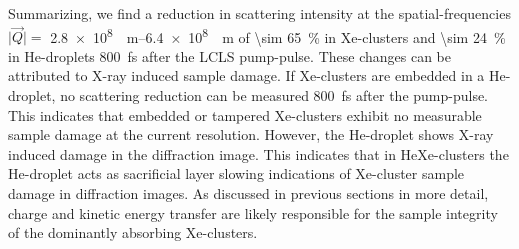 %
Summarizing, we find a reduction in scattering intensity at the spatial-frequencies $\lvert \vec{Q}\rvert=$ \SIrange[scientific-notation = fixed, fixed-exponent = 8]{2.8e8}{6.4e8}{\per\meter} of \SI{\sim 65}{\percent} in Xe-clusters and \SI{\sim 24}{\percent} in He-droplets \SI{800}{\femto\second} after the LCLS pump-pulse. These changes can be attributed to X-ray induced sample damage. If Xe-clusters are embedded in a He-droplet, no scattering reduction can be measured \SI{800}{\femto\second} after the pump-pulse. This indicates that embedded or tampered Xe-clusters exhibit no measurable sample damage at the current resolution. However, the He-droplet shows X-ray induced damage in the diffraction image. This indicates that in HeXe-clusters the He-droplet acts as sacrificial layer slowing indications of Xe-cluster sample damage in diffraction images. As discussed in previous sections in  more detail, charge and kinetic energy transfer \cite{Hau-Riege-2007-PRL,Hoener-2008-JPB} are likely responsible for the sample integrity of the dominantly absorbing Xe-clusters.
%
%
%
%
%
%
